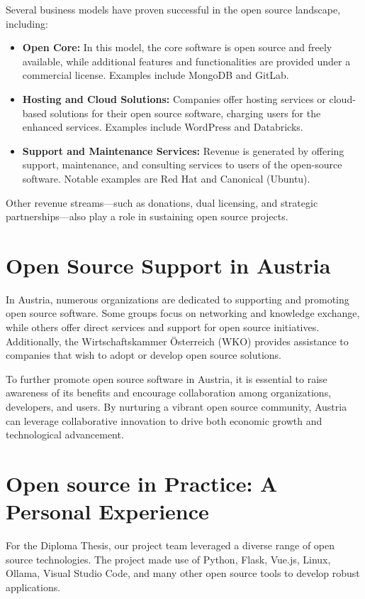 Several business models have proven successful in the open source landscape, including:
\begin{itemize}
    \item \textbf{Open Core:} In this model, the core software is open source and freely available, while additional features and functionalities are provided under a commercial license. Examples include MongoDB and GitLab.
    \item \textbf{Hosting and Cloud Solutions:} Companies offer hosting services or cloud-based solutions for their open source software, charging users for the enhanced services. Examples include WordPress and Databricks.
    \item \textbf{Support and Maintenance Services:} Revenue is generated by offering support, maintenance, and consulting services to users of the open-source software. Notable examples are Red Hat and Canonical (Ubuntu).
\end{itemize}

Other revenue streams—such as donations, dual licensing, and strategic partnerships—also play a role in sustaining open source projects.

\section{Open Source Support in Austria}

In Austria, numerous organizations are dedicated to supporting and promoting open source software. 
Some groups focus on networking and knowledge exchange, while others offer direct services and support for open source initiatives. 
Additionally, the Wirtschaftskammer Österreich (WKO) provides assistance to companies that wish to adopt or develop open source solutions.

To further promote open source software in Austria, 
it is essential to raise awareness of its benefits and encourage collaboration among organizations, developers, and users. 
By nurturing a vibrant open source community, Austria can leverage collaborative innovation to drive both economic growth and technological advancement.

\cite{Open-Source-Guide-Austria}

\section{Open source in Practice: A Personal Experience}

For the Diploma Thesis, our project team leveraged a diverse range of open source technologies. 
The project made use of Python, Flask, Vue.js, Linux, Ollama, Visual Studio Code, 
and many other open source tools to develop robust applications.

